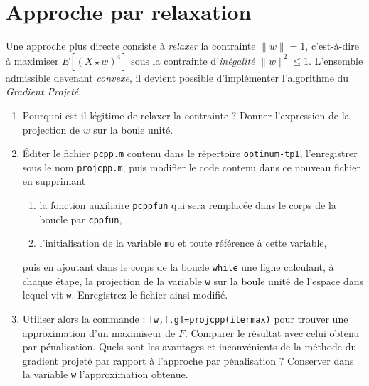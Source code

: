 \documentclass[10pt,a4paper,fleqn]{article}
\newcommand{\onit}{\begin{enumerate}}
\newcommand{\offit}{\end{enumerate}}
\renewcommand{\tt}{\texttt}
\begin{document}
\section{ Approche par relaxation}
Une approche plus directe consiste \`{a} \textit{relaxer} la contrainte $\| w\|=1$, c'est-\`{a}-dire \`{a} maximiser $E[(X\star w)^4]$ sous la contrainte d'\textit{in\'{e}galit\'{e}} $\| w \|^2 \leq 1$. L'ensemble admissible devenant \textit{convexe}, il devient possible d'impl\'{e}menter l'algorithme du \textit{Gradient Projet\'{e}}.
\onit
\item Pourquoi est-il légitime de relaxer la contrainte ? Donner
  l'expression de la projection de $w$ sur la boule unité.
\item \'Editer le fichier \tt{pcpp.m} contenu dans le r\'{e}pertoire \tt{optinum-tp1}, l'enregistrer sous le nom \tt{projcpp.m}, puis modifier le code contenu dans ce nouveau fichier en supprimant
\onit
\item la fonction auxiliaire \tt{pcppfun} qui sera remplac\'{e}e dans le corps de la boucle par \tt{cppfun},
\item l'initialisation de la variable \tt{mu} et toute r\'{e}f\'{e}rence \`{a} cette variable,
\offit
puis en ajoutant dans le corps de la boucle \tt{while} une ligne calculant, \`{a} chaque \'{e}tape, la projection de la variable \tt w sur la boule unit\'{e} de l'espace dans lequel vit \tt w. Enregistrez le fichier ainsi modifi\'{e}.
\item Utiliser alors la commande : \tt{[w,f,g]=projcpp(itermax)} pour
  trouver une approximation d'un maximiseur de $F$. Comparer le
  résultat avec celui obtenu par p\'{e}nalisation. Quels sont les
  avantages et inconvénients de la méthode du gradient projeté par
  rapport à l'approche par pénalisation ? Conserver dans la variable
  \tt w l'approximation obtenue.  \offit
\end{document}
